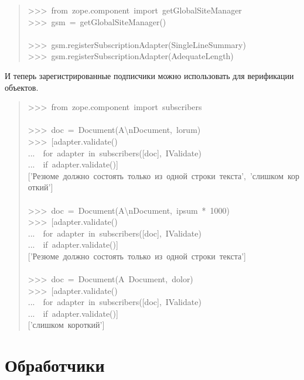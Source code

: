 \documentclass[a4paper,openany,twoside,final]{book}
\begin{document}
\begin{quote}{\ttfamily \raggedright \noindent
>{}>{}>~from~zope.component~import~getGlobalSiteManager\\
>{}>{}>~gsm~=~getGlobalSiteManager()\\
~\\
>{}>{}>~gsm.registerSubscriptionAdapter(SingleLineSummary)\\
>{}>{}>~gsm.registerSubscriptionAdapter(AdequateLength)
}
\end{quote}

И теперь зарегистрированные подписчики можно использовать для
верификации объектов.

\begin{quote}{\ttfamily \raggedright \noindent
>{}>{}>~from~zope.component~import~subscribers\\
~\\
>{}>{}>~doc~=~Document(\textquotedbl{}A\textbackslash{}nDocument\textquotedbl{},~\textquotedbl{}lorum\textquotedbl{})\\
>{}>{}>~{[}adapter.validate()\\
...~~for~adapter~in~subscribers({[}doc{]},~IValidate)\\
...~~if~adapter.validate(){]}\\
{[}'Резюме~должно~состоять~только~из~одной~строки~текста',~'слишком~короткий'{]}\\
~\\
>{}>{}>~doc~=~Document(\textquotedbl{}A\textbackslash{}nDocument\textquotedbl{},~\textquotedbl{}ipsum\textquotedbl{}~*~1000)\\
>{}>{}>~{[}adapter.validate()\\
...~~for~adapter~in~subscribers({[}doc{]},~IValidate)\\
...~~if~adapter.validate(){]}\\
{[}'Резюме~должно~состоять~только~из~одной~строки~текста'{]}\\
~\\
>{}>{}>~doc~=~Document(\textquotedbl{}A~Document\textquotedbl{},~\textquotedbl{}dolor\textquotedbl{})\\
>{}>{}>~{[}adapter.validate()\\
...~~for~adapter~in~subscribers({[}doc{]},~IValidate)\\
...~~if~adapter.validate(){]}\\
{[}'слишком~короткий'{]}
}
\end{quote}


\section{Обработчики%
  \label{id47}%
}
\end{document}
